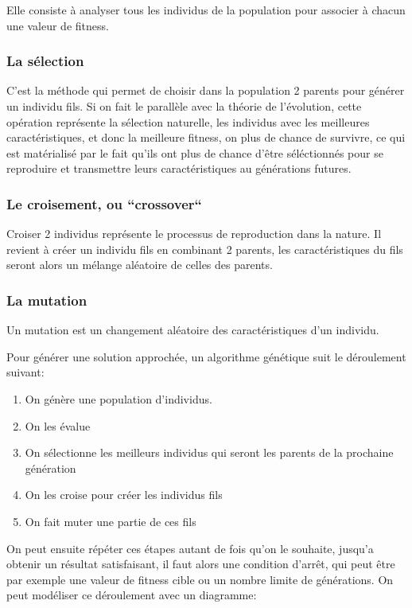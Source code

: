 \documentclass[11pt]{article}
\begin{document}
Elle consiste à analyser tous les individus de la population pour associer à chacun une valeur de fitness.

\subsubsection{La sélection}

C'est la méthode qui permet de choisir dans la population 2 parents pour générer un individu fils.
Si on fait le parallèle avec la théorie de l'évolution, cette opération représente la sélection naturelle,
les individus avec les meilleures caractéristiques, et donc la meilleure fitness, on plus de chance de survivre,
ce qui est matérialisé par le fait qu'ils ont plus de chance d'être séléctionnés pour se reproduire et transmettre
leurs caractéristiques au générations futures.

\subsubsection{Le croisement, ou ``crossover``}

Croiser 2 individus représente le processus de reproduction dans la nature. Il revient à créer un individu fils
en combinant 2 parents, les caractéristiques du fils seront alors un mélange aléatoire de celles des parents.

\subsubsection{La mutation}

Un mutation est un changement aléatoire des caractéristiques d'un individu. 

Pour générer une solution approchée, un algorithme génétique suit le déroulement suivant:

\begin{enumerate}
\item On génère une population d'individus.
\item On les évalue
\item On sélectionne les meilleurs individus qui seront les parents de la prochaine génération
\item On les croise pour créer les individus fils
\item On fait muter une partie de ces fils
\end{enumerate}

On peut ensuite répéter ces étapes autant de fois qu'on le souhaite, jusqu'a obtenir un résultat satisfaisant,
il faut alors une condition d'arrêt, qui peut être par exemple une valeur de fitness cible ou un nombre limite de générations.
On peut modéliser ce déroulement avec un diagramme:
\end{document}
